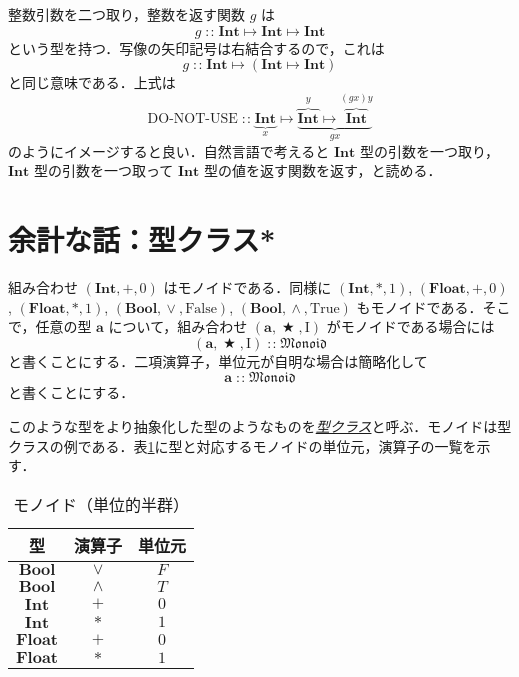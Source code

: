 \documentclass[a4paper,draft]{jsbook}
\newcommand{\keyword}[1]{{\underline{\emph{#1}}}}
\newcommand{\mSpecialConst}[1]{\mathrm{#1}} %
\newcommand{\mTrue}{\mSpecialConst{True}}
\newcommand{\mFalse}{\mSpecialConst{False}}
\newcommand{\mOne}{\mSpecialConst{I}}
\newcommand{\mVar}[1]{\text{DO-NOT-USE}}
\newcommand{\mType}[1]{\mathbf{#1}}
\newcommand{\mBoolType}{\mType{Bool}}
\newcommand{\mIntType}{\mType{Int}}
\newcommand{\mFloatType}{\mType{Float}}
\newcommand{\mSpecialTypeClass}[1]{\mathfrak{#1}} %
\newcommand{\mMonoidTypeClass}{\mSpecialTypeClass{Monoid}}
\newcommand{\mTupleWith}[1]{\left(#1\right)}
\DeclareMathOperator{\mIn}{{:\!:}}
\DeclareMathOperator{\mMapsTo}{\mapsto}
\DeclareMathOperator{\mBinOp}{\bigstar}
\DeclareMathOperator{\mLogicalAnd}{\wedge}
\DeclareMathOperator{\mLogicalOr}{\vee}
\newcommand{\mProjection}[2]{#1\mMapsTo#2}
\begin{document}
整数引数を二つ取り，整数を返す関数 $g$ は
\begin{equation}
g\mIn\mProjection{\mIntType}{\mProjection{\mIntType}{\mIntType}}
\end{equation}
という型を持つ．写像の矢印記号は右結合するので，これは
\begin{equation}
g\mIn\mProjection{\mIntType}{\left(\mProjection{\mIntType}{\mIntType}\right)}
\end{equation}
と同じ意味である．上式は
\begin{equation*}
\mVar{g}\mIn
\underbrace{\mIntType}_x
\mMapsTo
\underbrace{\overbrace{\mIntType}^y
\mMapsTo\overbrace{\mIntType}^{(gx)y}}_{gx}
\end{equation*}
のようにイメージすると良い．自然言語で考えると $\mIntType$ 型の引数を一つ取り，$\mIntType$ 型の引数を一つ取って $\mIntType$ 型の値を返す関数を返す，と読める．


\section{余計な話：型クラス*}

組み合わせ $\mTupleWith{\mIntType,+,0}$ はモノイドである．同様に $\mTupleWith{\mIntType,*,1}$, $\mTupleWith{\mFloatType,+,0}$, $\mTupleWith{\mFloatType,*,1}$, $\mTupleWith{\mBoolType,\mLogicalOr,\mFalse}$, $\mTupleWith{\mBoolType,\mLogicalAnd,\mTrue}$ もモノイドである．そこで，任意の型 $\mType{a}$ について，組み合わせ $\mTupleWith{\mType{a},\mBinOp,\mOne}$ がモノイドである場合には
\begin{equation}
\mTupleWith{\mType{a},\mBinOp,\mOne}\mIn\mMonoidTypeClass
\end{equation}
と書くことにする．二項演算子，単位元が自明な場合は簡略化して
\begin{equation}
\mType{a}\mIn\mMonoidTypeClass
\end{equation}
と書くことにする．

このような型をより抽象化した型のようなものを\keyword{型クラス}と呼ぶ．モノイドは型クラスの例である．表\ref{tab:monoids}に型と対応するモノイドの単位元，演算子の一覧を示す．

\begin{table}
\caption{モノイド（単位的半群）}
\label{tab:monoids}
\begin{center}
\begin{tabular}{||c||c|c||}
\hline
型
    &演算子
    &単位元\\
\hline\hline
$\mBoolType$
    &$\vee$
    &$F$\\
\hline
$\mBoolType$
    &$\wedge$
    &$T$\\
\hline
$\mIntType$
    &$+$
    &$0$\\
\hline
$\mIntType$
    &$*$
    &$1$\\
\hline
$\mFloatType$
    &$+$
    &$0$\\
\hline
$\mFloatType$
    &$*$
    &$1$\\
\hline
\end{tabular}
\end{center}
\end{table}
\end{document}
